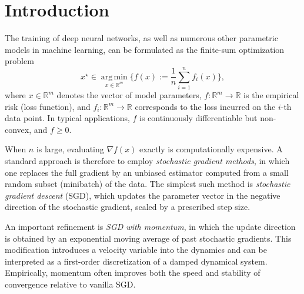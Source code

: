 \documentclass[11pt, a4paper,leqno]{amsart}
\theoremstyle{definition}
\numberwithin{equation}{section}
\begin{document}










    \setcounter{equation}{0} \setcounter{theorem}{0}






\section{Introduction}

The training of deep neural networks, as well as numerous other parametric models in machine learning, can be formulated as the finite-sum optimization problem
\begin{equation}\label{minima}
x^\star \in \operatorname*{arg\,min}_{x \in \mathbb{R}^m}\biggl\{ f(x) := \frac{1}{n} \sum_{i=1}^n f_{i}(x) \biggr\},
\end{equation}
where $x \in \mathbb{R}^m$ denotes the vector of model parameters, $f:\mathbb{R}^m \to \mathbb{R}$ is the empirical risk (loss function), and $f_i:\mathbb{R}^m \to \mathbb{R}$ corresponds to the loss incurred on the $i$-th data point. In typical applications, $f$ is continuously differentiable but non-convex, and $f \geq 0$.

When $n$ is large, evaluating $\nabla f(x)$ exactly is computationally expensive. A standard approach is therefore to employ \emph{stochastic gradient methods}, in which one replaces the full gradient by an unbiased estimator computed from a small random subset (minibatch) of the data. The simplest such method is \emph{stochastic gradient descent} (SGD), which updates the parameter vector in the negative direction of the stochastic gradient, scaled by a prescribed step size.

An important refinement is \emph{SGD with momentum}, in which the update direction is obtained by an exponential moving average of past stochastic gradients. This modification introduces a velocity variable into the dynamics and can be interpreted as a first-order discretization of a damped dynamical system. Empirically, momentum often improves both the speed and stability of convergence relative to vanilla SGD.
\end{document}
